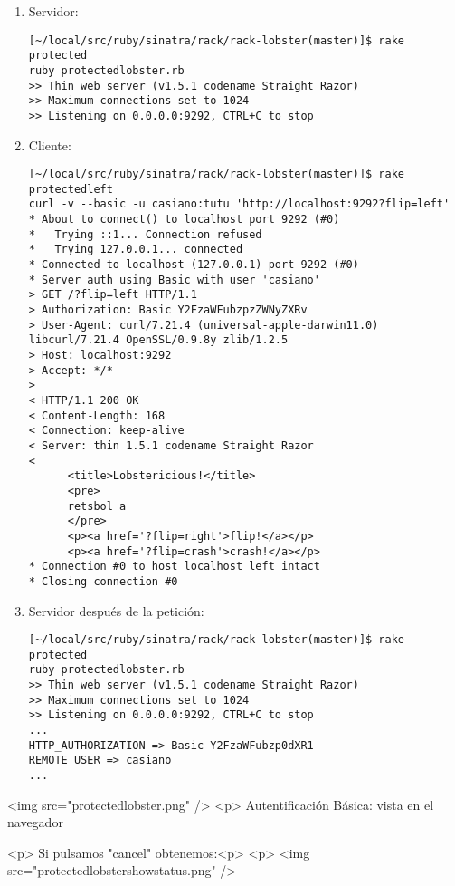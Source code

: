 
\begin{enumerate}
\item 
Servidor:
\begin{verbatim}
[~/local/src/ruby/sinatra/rack/rack-lobster(master)]$ rake protected
ruby protectedlobster.rb
>> Thin web server (v1.5.1 codename Straight Razor)
>> Maximum connections set to 1024
>> Listening on 0.0.0.0:9292, CTRL+C to stop

\end{verbatim}
\item 
Cliente:
\begin{verbatim}
[~/local/src/ruby/sinatra/rack/rack-lobster(master)]$ rake protectedleft
curl -v --basic -u casiano:tutu 'http://localhost:9292?flip=left'
* About to connect() to localhost port 9292 (#0)
*   Trying ::1... Connection refused
*   Trying 127.0.0.1... connected
* Connected to localhost (127.0.0.1) port 9292 (#0)
* Server auth using Basic with user 'casiano'
> GET /?flip=left HTTP/1.1
> Authorization: Basic Y2FzaWFubzpzZWNyZXRv
> User-Agent: curl/7.21.4 (universal-apple-darwin11.0) libcurl/7.21.4 OpenSSL/0.9.8y zlib/1.2.5
> Host: localhost:9292
> Accept: */*
> 
< HTTP/1.1 200 OK
< Content-Length: 168
< Connection: keep-alive
< Server: thin 1.5.1 codename Straight Razor
< 
      <title>Lobstericious!</title>
      <pre>
      retsbol a
      </pre>
      <p><a href='?flip=right'>flip!</a></p>
      <p><a href='?flip=crash'>crash!</a></p>
* Connection #0 to host localhost left intact
* Closing connection #0

\end{verbatim}
\item Servidor después de la petición:
\begin{verbatim}
[~/local/src/ruby/sinatra/rack/rack-lobster(master)]$ rake protected
ruby protectedlobster.rb
>> Thin web server (v1.5.1 codename Straight Razor)
>> Maximum connections set to 1024
>> Listening on 0.0.0.0:9292, CTRL+C to stop
...
HTTP_AUTHORIZATION => Basic Y2FzaWFubzp0dXR1
REMOTE_USER => casiano
...
\end{verbatim}
\end{enumerate}

\begin{rawhtml}
<img src="protectedlobster.png" />
<p>
Autentificación Básica: vista en el navegador
\end{rawhtml}

\begin{rawhtml}
<p>
Si pulsamos "cancel" obtenemos:<p>
<p>
<img src="protectedlobstershowstatus.png" />
\end{rawhtml}


